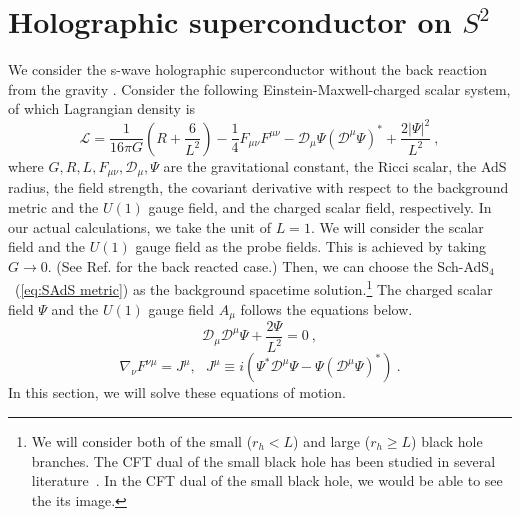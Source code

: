 \documentclass[a4paper,11pt]{article}
\begin{document}
\section{Holographic superconductor on \texorpdfstring{$S^2$}{Lg}}
\label{sec:Setup}

    We consider the s-wave holographic superconductor without the back reaction from the gravity \cite{Hartnoll:2008vx}. Consider the following  Einstein-Maxwell-charged scalar system, of which Lagrangian density is 
    \begin{equation}
        \mathcal{L} = \dfrac{1}{16\pi G}\left( R+\dfrac{6}{L^2} \right) -\frac{1}{4} F_{\mu \nu} F^{\mu \nu} 
        - \mathcal{D}_\mu \Psi (\mathcal{D}^\mu \Psi)^* + \frac{2|\Psi|^2}{L^2}\ ,
    \end{equation}
    where $G, R, L, F_{\mu \nu}, \mathcal{D}_\mu, \Psi$ are the gravitational constant, the Ricci scalar, the AdS radius, the field strength, the covariant derivative with respect to the background metric and the $U(1)$ gauge field, and the charged scalar field, respectively. 
    In our actual calculations, we take the unit of $L=1$.
    We will consider the scalar field and the $U(1)$ gauge field as the probe fields. This is achieved by taking $G \to 0$. (See Ref.\cite{Basu:2010uz} for the back reacted case.) Then, we can choose the Sch-AdS$_4$~(\ref{eq:SAdS metric}) as the background spacetime solution.\footnote{
    We will consider both of the small ($r_h<L$) and large ($r_h\geq L$) black hole branches. 
    The CFT dual of the small black hole has been studied in several literature~\cite{Hollowood:2006xb,Asplund:2008xd,Hanada:2016pwv,Yaffe:2017axl,Marolf:2018ldl,Choi:2021lbk}. 
    In the CFT dual of the small black hole, we would be able to see the its image.
    }
    The charged scalar field $\Psi$ and the $U(1)$ gauge field $A_{\mu}$ follows the equations below.
    \begin{equation} \label{eq:EoM_scalar}
        \mathcal{D}_{\mu}\mathcal{D}^{\mu}\Psi+\frac{2\Psi}{L^2}=0\ ,
    \end{equation}
    \begin{equation} \label{eq:EoM_gauge}
        \nabla_{\nu}F^{\nu\mu} = J^\mu
        ,\ \ \ J^\mu\equiv i\left( \Psi^* \mathcal{D}^{\mu} \Psi-\Psi \left( \mathcal{D}^{\mu} \Psi \right)^* \right)\ .
    \end{equation}
    In this section, we will solve these equations of motion. 
\end{document}

